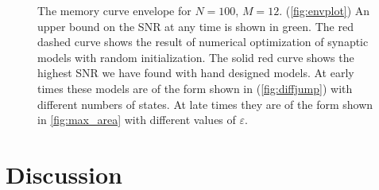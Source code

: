 \documentclass{article} %
\begin{document}
\begin{figure}
 \begin{center}
 \begin{myenuma}
  \item{}\label{fig:envplot}\hp
  \item{}\label{fig:diffjump}
 \end{myenuma}
 \end{center}
  \caption{The memory curve envelope for $N=100$, $M=12$.
  (\ref{fig:envplot}) An upper bound on the SNR at any time is shown in green.
  The red dashed curve shows the result of numerical optimization of synaptic models with random initialization.
  The solid red curve shows the highest SNR we have found with hand designed models.
  At early times these models are of the form shown in (\ref{fig:diffjump}) with different numbers of states.
  At late times they are of the form shown in \autoref{fig:max_area} with different values of $\varepsilon$.
  }\label{fig:env}
\end{figure}







\section{Discussion}\label{sec:disc}










\end{document}
